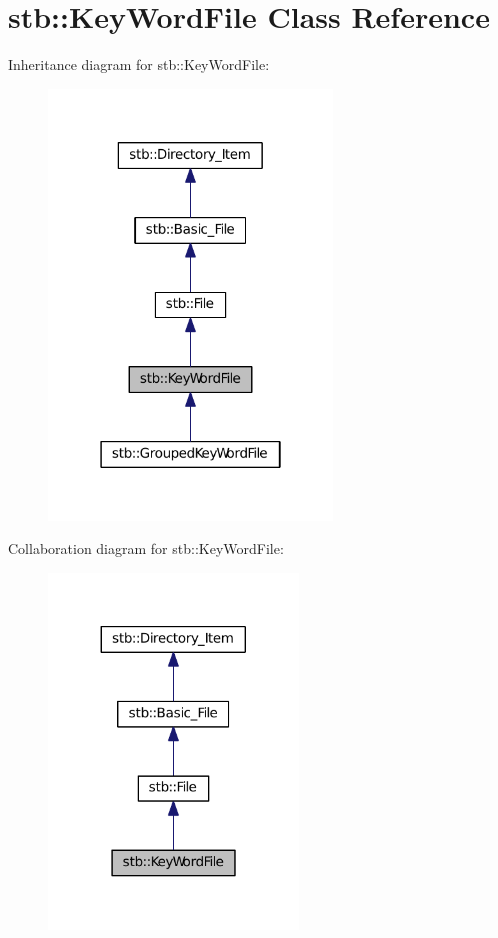 \hypertarget{classstb_1_1KeyWordFile}{\section{stb\+:\+:Key\+Word\+File Class Reference}
\label{classstb_1_1KeyWordFile}
}


Inheritance diagram for stb\+:\+:Key\+Word\+File\+:
\nopagebreak
\begin{figure}[H]
\begin{center}
\leavevmode
\includegraphics[width=214pt]{classstb_1_1KeyWordFile__inherit__graph}
\end{center}
\end{figure}


Collaboration diagram for stb\+:\+:Key\+Word\+File\+:
\nopagebreak
\begin{figure}[H]
\begin{center}
\leavevmode
\includegraphics[width=188pt]{classstb_1_1KeyWordFile__coll__graph}
\end{center}
\end{figure}
